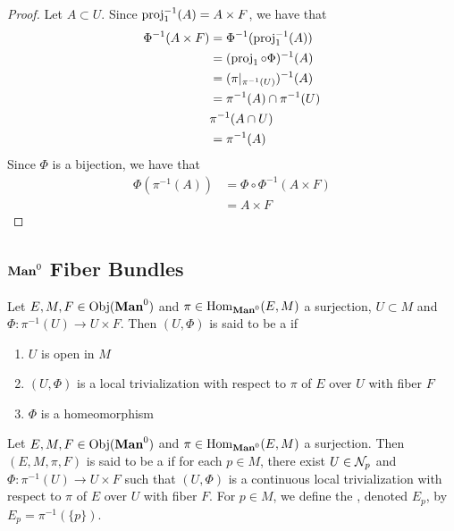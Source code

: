 \documentclass{book}
\begin{document}
	\begin{proof}
		Let $A \subset U$. Since $\operatorname{\text{proj}}_1^{-1}(A) = A \times F$, we have that 
		\begin{align*}
			\Phi^{-1}(A \times F)
			& = \Phi^{-1}(\operatorname{\text{proj}}_1^{-1}(A)) \\
			& = (\operatorname{\text{proj}}_1 \circ \Phi)^{-1}(A) \\
			& = (\pi|_{\pi^{-1}(U)})^{-1}(A) \\
			& = \pi^{-1}(A) \cap \pi^{-1}(U) \\
			&  \pi^{-1}(A \cap U) \\
			& = \pi^{-1}(A)
		\end{align*}
		Since $\Phi$ is a bijection, we have that
		\begin{align*}
			\Phi (\pi^{-1}(A))
			&= \Phi \circ \Phi^{-1}(A \times F) \\
			&= A \times F
		\end{align*}
	\end{proof}














	
	\subsection{$\Man0$ Fiber Bundles}
	
	\begin{defn} 
		Let $E, M, F \in \Obj(\Man0)$ and $\pi \in \Hom_{\Man0}(E, M)$ a surjection, $U \subset M$ and $\Phi: \pi^{-1}(U) \rightarrow U \times F$. Then $(U, \Phi)$ is said to be a   if 
		\begin{enumerate}
			\item $U$ is open in $M$
			\item $(U, \Phi)$ is a local trivialization with respect to $\pi$ of $E$ over $U$ with fiber $F$
			\item $\Phi$ is a homeomorphism
		\end{enumerate}
	\end{defn}
 
	\begin{defn} 
		Let $E,M, F \in \Obj(\Man0)$ and $\pi \in \Hom_{\Man0}(E, M)$ a surjection. Then $(E, M, \pi, F)$ is said to be a  if for each $p \in M$, there exist $U \in \mathcal{N}_p$ and $\Phi: \pi^{-1}(U) \rightarrow U \times F$ such that $(U, \Phi)$ is a continuous local trivialization with respect to $\pi$ of $E$ over $U$ with fiber $F$. For $p \in M$, we define the , denoted $E_p$, by $E_p = \pi^{-1}(\{p\})$.
	\end{defn}
\end{document}
